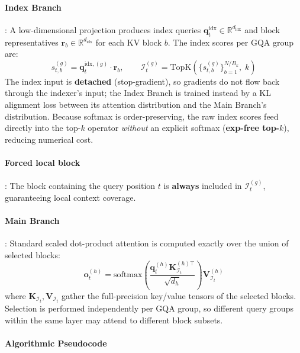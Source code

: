 \paragraph{Index Branch}: A low-dimensional projection produces index queries $\mathbf{q}_t^{\text{idx}} \in \mathbb{R}^{d_{\text{idx}}}$ and block representatives $\mathbf{r}_b \in \mathbb{R}^{d_{\text{idx}}}$ for each KV block $b$. The index scores per GQA group are:
\[
s_{t,b}^{(g)} = \mathbf{q}_t^{\text{idx},(g)} \cdot \mathbf{r}_b, \qquad \mathcal{I}_t^{(g)} = \mathrm{TopK}\left(\{s_{t,b}^{(g)}\}_{b=1}^{N/B_k},\; k\right)
\]
The index input is \textbf{detached} (stop-gradient), so gradients do not flow back through the indexer's input; the Index Branch is trained instead by a KL alignment loss between its attention distribution and the Main Branch's distribution. Because softmax is order-preserving, the raw index scores feed directly into the top-$k$ operator \emph{without} an explicit softmax (\textbf{exp-free top-$k$}), reducing numerical cost.

\paragraph{Forced local block}: The block containing the query position $t$ is \textbf{always} included in $\mathcal{I}_t^{(g)}$, guaranteeing local context coverage.

\paragraph{Main Branch}: Standard scaled dot-product attention is computed exactly over the union of selected blocks:
\[
\mathbf{o}_t^{(h)} = \mathrm{softmax}\left(\frac{\mathbf{q}_t^{(h)} \mathbf{K}_{\mathcal{I}_t}^{(h)\top}}{\sqrt{d_h}}\right) \mathbf{V}_{\mathcal{I}_t}^{(h)}
\]
where $\mathbf{K}_{\mathcal{I}_t}, \mathbf{V}_{\mathcal{I}_t}$ gather the full-precision key/value tensors of the selected blocks. Selection is performed independently per GQA group, so different query groups within the same layer may attend to different block subsets.

\paragraph{Algorithmic Pseudocode}

